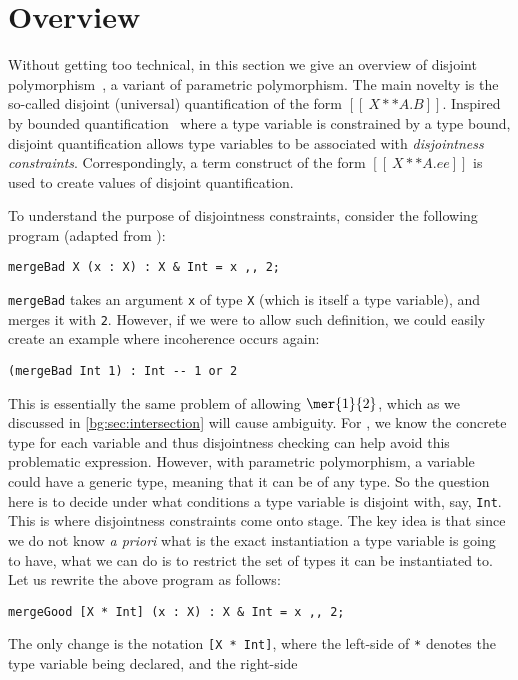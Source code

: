 
\section{Overview}

Without getting too technical, in this section we give an overview of
disjoint polymorphism~\citep{alpuimdisjoint}, a variant of parametric polymorphism. The main novelty
is the so-called disjoint (universal) quantification of the form
$[[ \ X ** A . B ]]$. Inspired by bounded quantification~\citep{cardelli1994extension} where a
type variable is constrained by a type bound, disjoint quantification allows
type variables to be associated with \textit{disjointness constraints}. Correspondingly, a
term construct of the form $[[ \ X ** A. ee ]]$ is used to create values of
disjoint quantification.

To understand the purpose of disjointness constraints, consider the following program (adapted from \citet{alpuimdisjoint}):
\begin{lstlisting}
mergeBad X (x : X) : X & Int = x ,, 2;
\end{lstlisting}
\lstinline{mergeBad} takes an argument \lstinline{x} of type \lstinline{X} (which is itself a type variable), and merges it with \lstinline{2}.
However, if we were to allow such definition, we could easily create an example where incoherence occurs again:
\begin{lstlisting}
(mergeBad Int 1) : Int -- 1 or 2
\end{lstlisting}
This is essentially the same problem of allowing $\mer{1}{2}$, which as we
discussed in \cref{bg:sec:intersection} will cause ambiguity. For \namee, we
know the concrete type for each variable and thus disjointness checking can help
avoid this problematic expression. However, with parametric polymorphism, a variable
could have a generic type, meaning that it can be of any type. So the question here
is to decide under what conditions a type variable is disjoint with, say,
\lstinline{Int}. This is where disjointness constraints come onto stage. The key idea
is that since we do not know \textit{a priori} what is the exact instantiation a
type variable is going to have, what we can do is to restrict the set of types
it can be instantiated to. Let us rewrite the above program as follows:
\begin{lstlisting}
mergeGood [X * Int] (x : X) : X & Int = x ,, 2;
\end{lstlisting}
The only change is the notation \lstinline{[X * Int]}, where the left-side of
\lstinline{*} denotes the type variable being declared, and the right-side
